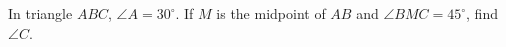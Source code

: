 In triangle $ABC$, $\angle A=30^\circ$. If $M$ is the midpoint of $AB$ and $\angle BMC=45^\circ$, find $\angle C$.
